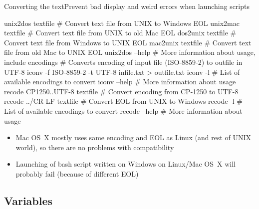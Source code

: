 \documentclass[compress, ucs, xelatex, 11pt, xcolor=svgnames,
  hyperref={
    bookmarks=true,
    unicode=true,
    colorlinks=true,
    pdftitle={Linux, command line and MetaCentrum},
    plainpages=false,
    pdfauthor={Vojtech Zeisek},
    pdfsubject={Course about use of Linux command line, writing shell scripts and using MetaCentrum of CESNET},
    pdfcreator={XeLaTeX},
    pdfkeywords={Linux, GNU, BASH, shell, command line, MetaCentrum},
    linkcolor=DarkRed,
    anchorcolor=DarkBlue,
    citecolor=Indigo,
    filecolor=NavyBlue,
    menucolor=DarkMagenta,
    urlcolor=DarkBlue,
    pdftex},
  url={hyphens, lowtilde} %
  ]{beamer}
\begin{document}
\begin{frame}[fragile]{Converting the text}{Prevent bad display and weird errors when launching scripts}
  \begin{bashcode}
    unix2dos textfile # Convert text file from UNIX to Windows EOL
    unix2mac textfile # Convert text file from UNIX to old Mac EOL
    dos2unix textfile # Convert text file from Windows to UNIX EOL
    mac2unix textfile # Convert text file from old Mac to UNIX EOL
    unix2dos --help # More information about usage, include encodings
    # Converts encoding of input file (ISO-8859-2) to outfile in UTF-8
    iconv -f ISO-8859-2 -t UTF-8 infile.txt > outfile.txt
    iconv -l # List of available encodings to convert
    iconv --help # More information about usage
    recode CP1250..UTF-8 textfile # Convert encoding from CP-1250 to UTF-8
    recode ../CR-LF textfile # Convert EOL from UNIX to Windows
    recode -l # List of available encodings to convert
    recode --help # More information about usage
  \end{bashcode}
  \begin{itemize}
    \item Mac OS~X mostly uses same encoding and EOL as Linux (and rest of UNIX world), so there are no problems with compatibility
    \item Launching of bash script written on Windows on Linux/Mac OS~X will probably fail (because of different EOL)
  \end{itemize}
\end{frame}

\subsection{Variables}
\end{document}
